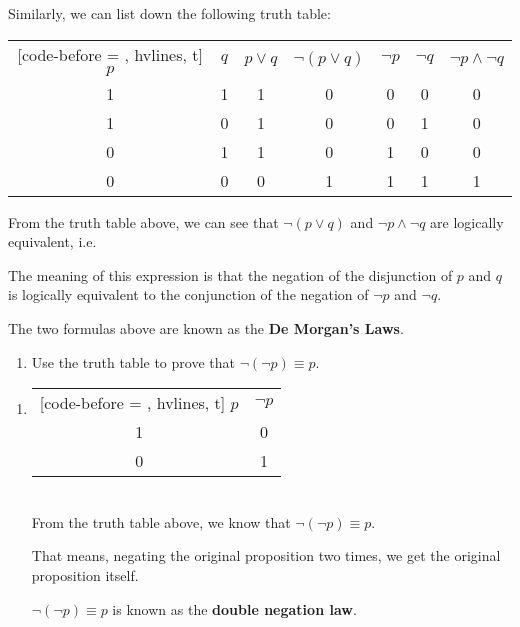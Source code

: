 \documentclass{report}
\begin{document}
Similarly, we can list down the following truth table:
\begin{center}
    \begin{NiceTabular}{|c|c|c|c|c|c|c|}[code-before = , hvlines, t]
        $p$ & $q$ & $p \lor q$ & $\neg(p \lor q)$ & $\neg p$ & $\neg q$ & $\neg p \land \neg q$ \\
        1   & 1   & 1          & 0                & 0        & 0        & 0                     \\
        1   & 0   & 1          & 0                & 0        & 1        & 0                     \\
        0   & 1   & 1          & 0                & 1        & 0        & 0                     \\
        0   & 0   & 0          & 1                & 1        & 1        & 1                     \\
    \end{NiceTabular}
\end{center}

From the truth table above, we can see that $\neg (p \lor q)$ and $\neg p \land
    \neg q$ are logically equivalent, i.e.

\begin{center}
\end{center}

The meaning of this expression is that the negation of the disjunction of $p$
and $q$ is logically equivalent to the conjunction of the negation of $\neg p$
and $\neg q$.

The two formulas above are known as the \textbf{De Morgan's Laws}.
\vspace{0.5cm}
\begin{enumerate}[label=\textbf{Example \arabic*}, leftmargin=*, start=11]
    \item Use the truth table to prove that $\neg (\neg p) \equiv p$.
\end{enumerate}
\begin{enumerate}[label=\textbf{Sol.}, leftmargin=*]
    \item
          \begin{NiceTabular}{|c|c|}[code-before = , hvlines, t]
              $p$ & $\neg p$ \\
              1   & 0        \\
              0   & 1        \\
          \end{NiceTabular}\\

          From the truth table above, we know that $\neg (\neg p) \equiv p$.

          That means, negating the original proposition two times, we get the original
          proposition itself.

          $\neg (\neg p) \equiv p$ is known as the \textbf{double negation law}.
\end{enumerate}
\end{document}
